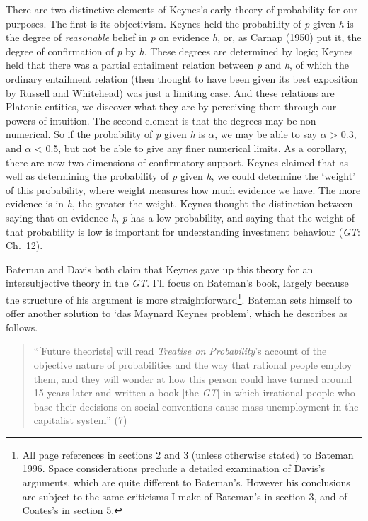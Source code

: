 \documentclass[noflushend]{philosophersimprint}
\begin{document}
There are two distinctive elements of Keynes's early theory of
probability for our purposes. The first is its objectivism. Keynes held
the probability of \emph{p} given \emph{h} is the degree of
\emph{reasonable} belief in \emph{p} on evidence \emph{h}, or, as Carnap
(1950) put it, the degree of confirmation of \emph{p} by \emph{h}. These
degrees are determined by logic; Keynes held that there was a partial
entailment relation between \emph{p} and \emph{h}, of which the ordinary
entailment relation (then thought to have been given its best exposition
by Russell and Whitehead) was just a limiting case. And these relations
are Platonic entities, we discover what they are by perceiving them
through our powers of intuition. The second element is that the degrees
may be non-numerical. So if the probability of \emph{p} given \emph{h}
is \({\alpha}\), we may be able to say \({\alpha}\) \textgreater{} 0.3,
and \({\alpha}\) \textless{} 0.5, but not be able to give any finer
numerical limits. As a corollary, there are now two dimensions of
confirmatory support. Keynes claimed that as well as determining the
probability of \emph{p} given \emph{h}, we could determine the `weight'
of this probability, where weight measures how much evidence we have.
The more evidence is in \emph{h}, the greater the weight. Keynes thought
the distinction between saying that on evidence \emph{h}, \emph{p} has a
low probability, and saying that the weight of that probability is low
is important for understanding investment behaviour (\emph{GT}: Ch.~12).

Bateman and Davis both claim that Keynes gave up this theory for an
intersubjective theory in the \emph{GT}. I'll focus on Bateman's book,
largely because the structure of his argument is more
straightforward\footnote{All page references in sections 2 and 3 (unless
  otherwise stated) to Bateman 1996. Space considerations preclude a
  detailed examination of Davis's arguments, which are quite different
  to Bateman's. However his conclusions are subject to the same
  criticisms I make of Bateman's in section 3, and of Coates's in
  section 5.}. Bateman sets himself to offer another solution to `das
Maynard Keynes problem', which he describes as follows.

\begin{quote}
``{[}Future theorists{]} will read \emph{Treatise on Probability}'s
account of the objective nature of probabilities and the way that
rational people employ them, and they will wonder at how this person
could have turned around 15 years later and written a book {[}the
\emph{GT}{]} in which irrational people who base their decisions on
social conventions cause mass unemployment in the capitalist system''
(7)
\end{quote}
\end{document}
